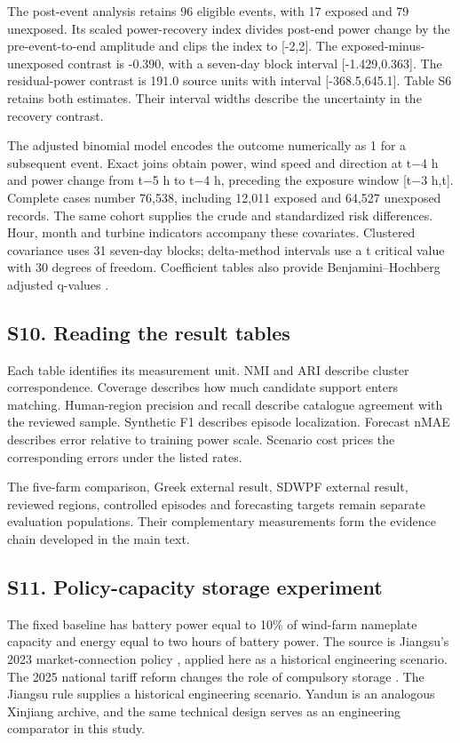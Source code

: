 \documentclass[a4paper,11pt]{article}
\begin{document}
The post-event analysis retains 96 eligible events, with 17 exposed and 79 unexposed. Its scaled power-recovery index divides post-end power change by the pre-event-to-end amplitude and clips the index to {[}-2,2{]}. The exposed-minus-unexposed contrast is -0.390, with a seven-day block interval {[}-1.429,0.363{]}. The residual-power contrast is 191.0 source units with interval {[}-368.5,645.1{]}. Table S6 retains both estimates. Their interval widths describe the uncertainty in the recovery contrast.

The adjusted binomial model encodes the outcome numerically as 1 for a subsequent event. Exact joins obtain power, wind speed and direction at t−4 h and power change from t−5 h to t−4 h, preceding the exposure window {[}t−3 h,t{]}. Complete cases number 76,538, including 12,011 exposed and 64,527 unexposed records. The same cohort supplies the crude and standardized risk differences. Hour, month and turbine indicators accompany these covariates. Clustered covariance uses 31 seven-day blocks; delta-method intervals use a t critical value with 30 degrees of freedom. Coefficient tables also provide Benjamini--Hochberg adjusted q-values \citep{bh1995}.

\subsection{S10. Reading the result tables}\label{s10.-reading-the-result-tables}

Each table identifies its measurement unit. NMI and ARI describe cluster correspondence. Coverage describes how much candidate support enters matching. Human-region precision and recall describe catalogue agreement with the reviewed sample. Synthetic F1 describes episode localization. Forecast nMAE describes error relative to training power scale. Scenario cost prices the corresponding errors under the listed rates.

The five-farm comparison, Greek external result, SDWPF external result, reviewed regions, controlled episodes and forecasting targets remain separate evaluation populations. Their complementary measurements form the evidence chain developed in the main text.

\subsection{S11. Policy-capacity storage experiment}\label{s11.-policy-capacity-storage-experiment}

The fixed baseline has battery power equal to 10\% of wind-farm nameplate capacity and energy equal to two hours of battery power. The source is Jiangsu's 2023 market-connection policy \citep{jiangsu2023storage}, applied here as a historical engineering scenario. The 2025 national tariff reform changes the role of compulsory storage \citep{ndrc2025market}. The Jiangsu rule supplies a historical engineering scenario. Yandun is an analogous Xinjiang archive, and the same technical design serves as an engineering comparator in this study.
\end{document}
